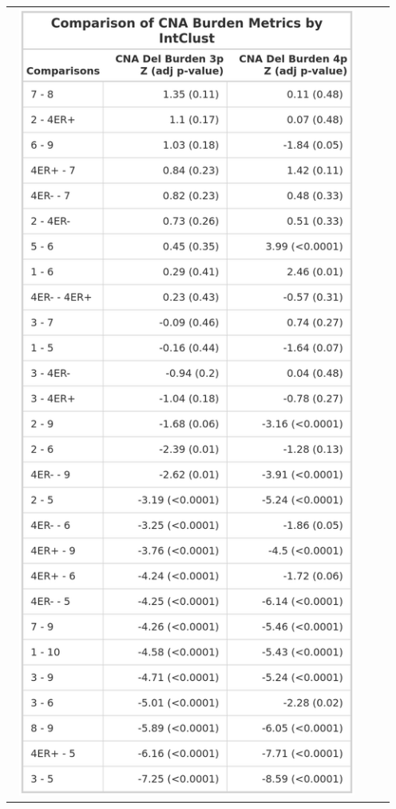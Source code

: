 \begin{table}[!htb]
\begin{minipage}[c]{0.45\textwidth}
\begin{tabular}{ccc}
\end{tabular}
\end{minipage}
\hspace{0.8cm}
\begin{minipage}[c]{0.45\textwidth}
\centering
\begin{tabular}{ccc}
\includegraphics[width=0.96\textwidth]{../tables/Chapter_2/ChrArm_CNA_Burden_Metric_Comparisons_IC_2.png}
\end{tabular}
\end{minipage}
\label{tab:PA_IC}
\end{table}
\clearpage 

